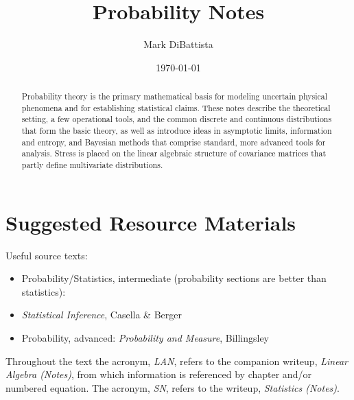 \documentclass[12pt, twoside, draft]{article}
\begin{document}
\setpagewiselinenumbers


\title{Probability Notes}

\footnotesize\date{\today}

\author{Mark DiBattista}

\maketitle

\begin{abstract}
Probability theory is the primary mathematical basis for modeling uncertain physical phenomena and for establishing statistical claims.  These notes describe the theoretical setting, a few operational tools, and the common discrete and continuous distributions that form the basic theory, as well as introduce ideas in asymptotic limits, information and entropy, and Bayesian methods that comprise standard, more advanced tools for analysis.  Stress is placed on the linear algebraic structure of covariance matrices that partly define multivariate distributions.

\end{abstract}


\section{Suggested Resource Materials}
Useful source texts:

\begin{itemize}[noitemsep]
\item Probability/Statistics, intermediate (probability sections are better than statistics):\hspace{50pt}
\item[] \hspace{200pt} \textit{Statistical Inference}, Casella \& Berger
\item Probability, advanced: \hspace{98pt} \textit{Probability and Measure}, Billingsley
\end{itemize}

Throughout the text the acronym, \textit{LAN}, refers to the companion writeup, \textit{Linear Algebra (Notes)}, from which information is referenced by chapter and/or numbered equation.  The acronym, \textit{SN}, refers to the writeup, \textit{Statistics (Notes)}.
\end{document}
